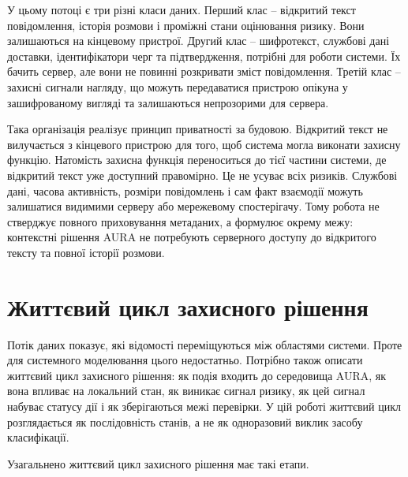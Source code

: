 У цьому потоці є три різні класи даних. Перший клас -- відкритий текст повідомлення, історія розмови і проміжні стани оцінювання ризику. Вони залишаються на кінцевому пристрої. Другий клас -- шифротекст, службові дані доставки, ідентифікатори черг та підтвердження, потрібні для роботи системи. Їх бачить сервер, але вони не повинні розкривати зміст повідомлення. Третій клас -- захисні сигнали нагляду, що можуть передаватися пристрою опікуна у зашифрованому вигляді та залишаються непрозорими для сервера.

Така організація реалізує принцип приватності за будовою. Відкритий текст не вилучається з кінцевого пристрою для того, щоб система могла виконати захисну функцію. Натомість захисна функція переноситься до тієї частини системи, де відкритий текст уже доступний правомірно. Це не усуває всіх ризиків. Службові дані, часова активність, розміри повідомлень і сам факт взаємодії можуть залишатися видимими серверу або мережевому спостерігачу. Тому робота не стверджує повного приховування метаданих, а формулює окрему межу: контекстні рішення AURA не потребують серверного доступу до відкритого тексту та повної історії розмови.

\section{Життєвий цикл захисного рішення}
\label{sec:decision-lifecycle}

Потік даних показує, які відомості переміщуються між областями системи. Проте для системного моделювання цього недостатньо. Потрібно також описати життєвий цикл захисного рішення: як подія входить до середовища AURA, як вона впливає на локальний стан, як виникає сигнал ризику, як цей сигнал набуває статусу дії і як зберігаються межі перевірки. У цій роботі життєвий цикл розглядається як послідовність станів, а не як одноразовий виклик засобу класифікації.

Узагальнено життєвий цикл захисного рішення має такі етапи.

